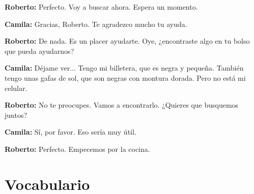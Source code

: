 \documentclass[12pt,a4paper]{article}
\begin{document}
\textbf{Roberto:} Perfecto. Voy a buscar ahora. Espera un momento.

\textbf{Camila:} Gracias, Roberto. Te agradezco mucho tu ayuda.

\textbf{Roberto:} De nada. Es un placer ayudarte. Oye, ¿encontraste algo en tu bolso que pueda ayudarnos?

\textbf{Camila:} Déjame ver... Tengo mi billetera, que es negra y pequeña. También tengo unas gafas de sol, que son negras con montura dorada. Pero no está mi celular.

\textbf{Roberto:} No te preocupes. Vamos a encontrarlo. ¿Quieres que busquemos juntos?

\textbf{Camila:} Sí, por favor. Eso sería muy útil.

\textbf{Roberto:} Perfecto. Empecemos por la cocina.

\newpage

\section*{Vocabulario}
\end{document}
